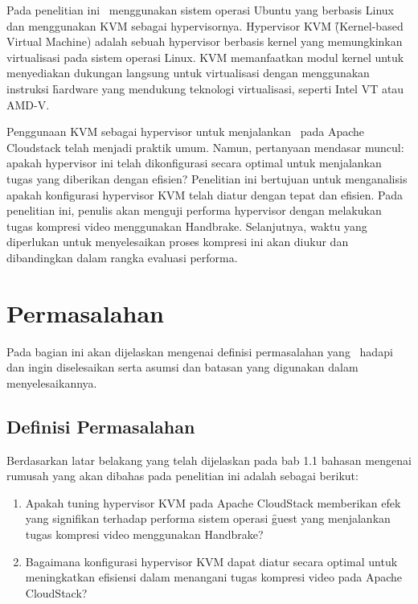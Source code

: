 Pada penelitian ini \saya\ menggunakan sistem operasi Ubuntu yang berbasis Linux dan menggunakan KVM sebagai hypervisornya. Hypervisor KVM \f{(Kernel-based Virtual Machine)} adalah sebuah hypervisor berbasis kernel yang memungkinkan virtualisasi pada sistem operasi Linux\cite{whatiskvm}. KVM memanfaatkan modul kernel untuk menyediakan dukungan langsung untuk virtualisasi dengan menggunakan instruksi \f{hardware} yang mendukung teknologi virtualisasi, seperti Intel VT atau AMD-V.

Penggunaan KVM sebagai hypervisor untuk menjalankan \vm\ pada Apache Cloudstack telah menjadi praktik umum. Namun, pertanyaan mendasar muncul: apakah hypervisor ini telah dikonfigurasi secara optimal untuk menjalankan tugas yang diberikan dengan efisien? Penelitian ini bertujuan untuk menganalisis apakah konfigurasi hypervisor KVM telah diatur dengan tepat dan efisien. Pada penelitian ini, penulis akan menguji performa hypervisor dengan melakukan tugas kompresi video menggunakan Handbrake. Selanjutnya, waktu yang diperlukan untuk menyelesaikan proses kompresi ini akan diukur dan dibandingkan dalam rangka evaluasi performa.


\section{Permasalahan}
\hspace{0.5cm} Pada bagian ini akan dijelaskan mengenai definisi permasalahan yang \saya~hadapi dan ingin diselesaikan serta asumsi dan batasan yang digunakan dalam menyelesaikannya.


\subsection{Definisi Permasalahan}
\hspace{0.5cm} Berdasarkan latar belakang yang telah dijelaskan pada bab 1.1 bahasan mengenai rumusah yang akan dibahas pada penelitian ini adalah sebagai berikut:
\begin{enumerate}
  \item Apakah tuning hypervisor KVM pada Apache CloudStack memberikan efek yang signifikan terhadap performa sistem operasi \f{guest} yang menjalankan tugas kompresi video menggunakan Handbrake?
  \item Bagaimana konfigurasi hypervisor KVM dapat diatur secara optimal untuk meningkatkan efisiensi dalam menangani tugas kompresi video pada Apache CloudStack?
\end{enumerate}

